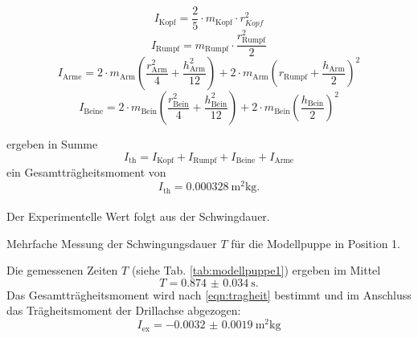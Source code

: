 \begin{equation*}
    I_\text{Kopf} = \frac{2}{5} \cdot m_\text{Kopf} \cdot r_{Kopf}^2
\end{equation*}
\begin{equation*}
    I_\text{Rumpf} = m_\text{Rumpf} \cdot \frac{r_\text{Rumpf}^2}{2}
\end{equation*}
\begin{equation*}
    I_\text{Arme} = 2 \cdot m_\text{Arm} \left(\frac{r_\text{Arm}^2}{4} + \frac{h_\text{Arm}^2}{12}\right) + 2 \cdot m_\text{Arm}\left(r_\text{Rumpf} + \frac{h_\text{Arm}}{2}\right)^2
\end{equation*}
\begin{equation*}
    I_\text{Beine} = 2 \cdot m_\text{Bein} \left(\frac{r_\text{Bein}^2}{4} + \frac{h_\text{Bein}^2}{12} \right) + 2 \cdot m_\text{Bein} \left(\frac{h_\text{Bein}}{2}\right)^2
\end{equation*}

ergeben in Summe
\begin{equation*}
    I_\text{th} = I_\text{Kopf} + I_\text{Rumpf} + I_\text{Beine} + I_\text{Arme}
\end{equation*}
ein Gesamtträgheitsmoment von
\begin{equation*}
    I_\text{th} = \SI{0.000328}{\metre^2\kg} .
\end{equation*}
\\
Der Experimentelle Wert folgt aus der Schwingdauer.
\begin{table}
    \centering
    \caption{Mehrfache Messung der Schwingungsdauer $T$ für die Modellpuppe in Position 1.}
    \label{tab:modellpuppe1}  
\end{table}
Die gemessenen Zeiten $T$ (siehe Tab. \ref{tab:modellpuppe1}) ergeben im Mittel
\begin{equation*}
    T = \SI{0.874(34)}{\second} .
\end{equation*}
Das Gesamtträgheitsmoment wird nach \autoref{eqn:tragheit} bestimmt und im Anschluss das Trägheitsmoment der Drillachse abgezogen:
\begin{equation*}
    I_\text{ex} = \SI{-0.0032(19)}{\metre^2\kg}
\end{equation*}
\FloatBarrier

